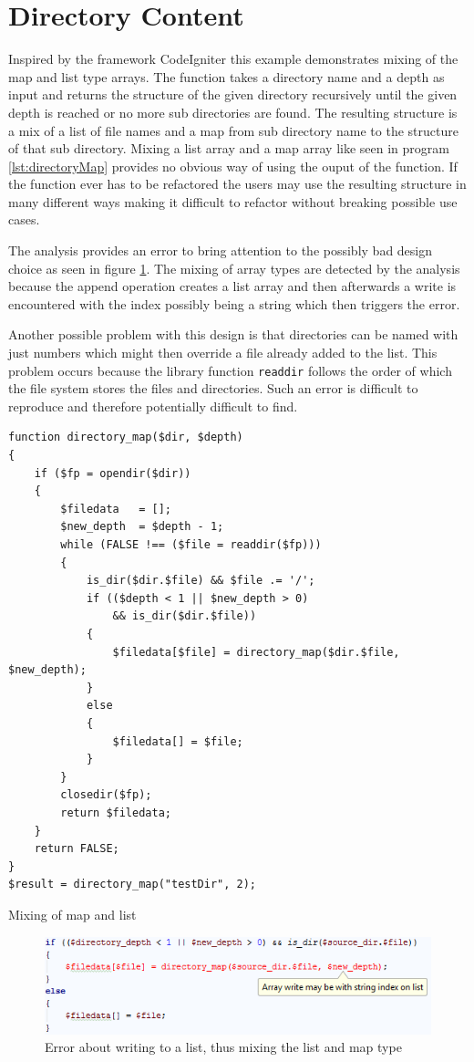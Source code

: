 \section{Directory Content}
\label{sec:directoryContent}
Inspired by the framework CodeIgniter this example demonstrates mixing of the map and list type arrays. The function takes a directory name and a depth as input and returns the structure of the given directory recursively until the given depth is reached or no more sub directories are found. The resulting structure is a mix of a list of file names and a map from sub directory name to the structure of that sub directory. Mixing a list array and a map array like seen in program \ref{lst:directoryMap} provides no obvious way of using the ouput of the function. If the function ever has to be refactored the users may use the resulting structure in many different ways making it difficult to refactor without breaking possible use cases.

The analysis provides an error to bring attention to the possibly bad design choice as seen in figure \ref{fig:directoryScreenshot}. The mixing of array types are detected by the analysis because the append operation creates a list array and then afterwards a write is encountered with the index possibly being a string which then triggers the error.

Another possible problem with this design is that directories can be named with just numbers which might then override a file already added to the list. This problem occurs because the library function \texttt{readdir} follows the order of which the file system stores the files and directories. Such an error is difficult to reproduce and therefore potentially difficult to find.

\begin{program}
\begin{lstlisting}
function directory_map($dir, $depth)
{
    if ($fp = opendir($dir))
    {
        $filedata	= [];
        $new_depth	= $depth - 1;
        while (FALSE !== ($file = readdir($fp)))
        {
            is_dir($dir.$file) && $file .= '/';
            if (($depth < 1 || $new_depth > 0) 
                && is_dir($dir.$file))
            {
                $filedata[$file] = directory_map($dir.$file, $new_depth);
            }
            else
            {
                $filedata[] = $file;
            }
        }
        closedir($fp);
        return $filedata;
    }
    return FALSE;
}
$result = directory_map("testDir", 2);
\end{lstlisting}
\caption{Mixing of map and list}
\label{lst:directoryMap}
\end{program}

\begin{figure}[htbp]
\centering
\includegraphics[scale=0.6]{chapters/caseStudy/directoryError}
\caption{Error about writing to a list, thus mixing the list and map type}
\label{fig:directoryScreenshot}
\end{figure}